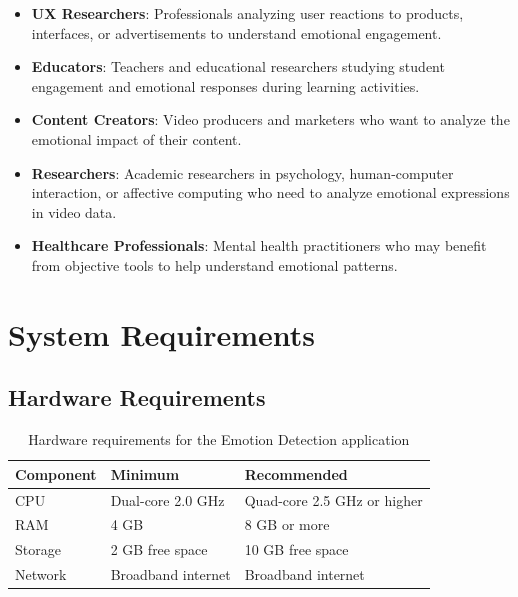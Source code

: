 \begin{itemize}
    \item \textbf{UX Researchers}: Professionals analyzing user reactions to products, interfaces, or advertisements to understand emotional engagement.

    \item \textbf{Educators}: Teachers and educational researchers studying student engagement and emotional responses during learning activities.

    \item \textbf{Content Creators}: Video producers and marketers who want to analyze the emotional impact of their content.

    \item \textbf{Researchers}: Academic researchers in psychology, human-computer interaction, or affective computing who need to analyze emotional expressions in video data.

    \item \textbf{Healthcare Professionals}: Mental health practitioners who may benefit from objective tools to help understand emotional patterns.
\end{itemize}

\section{System Requirements}
\label{sec:system-requirements}

\subsection{Hardware Requirements}

\begin{table}[H]
\centering
\begin{tabular}{|l|l|l|}
\hline
\textbf{Component} & \textbf{Minimum} & \textbf{Recommended} \\
\hline
CPU & Dual-core 2.0 GHz & Quad-core 2.5 GHz or higher \\
\hline
RAM & 4 GB & 8 GB or more \\
\hline
Storage & 2 GB free space & 10 GB free space \\
\hline
Network & Broadband internet & Broadband internet \\
\hline
\end{tabular}
\caption{Hardware requirements for the Emotion Detection application}
\label{tab:hardware-requirements}
\end{table}

